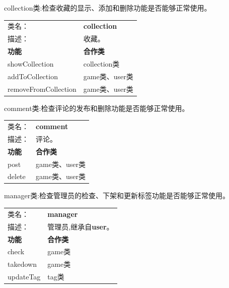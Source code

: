 \documentclass[12pt]{ctexart} %
\begin{document}
collection类:检查收藏的显示、添加和删除功能是否能够正常使用。
\begin{table}[H]
  \centering
  \begin{tabular}{|ll|}  %
    \cline{1-2}  %
    类名：& \textbf{collection} \\
    \cline{1-2}
    描述：& 收藏。 \\
    \cline{1-2}
    \multicolumn{1}{|l|}{\textbf{功能}} & {\textbf{合作类}} \\  %
    \hline
    \multicolumn{1}{|l|}{showCollection} & {collection类}  \\
    \hline
    \multicolumn{1}{|l|}{addToCollection} & {game类、user类} \\
    \hline
    \multicolumn{1}{|l|}{removeFromCollection} & {game类、user类} \\
    \hline
  \end{tabular}
\end{table}

comment类:检查评论的发布和删除功能是否能够正常使用。
\begin{table}[H]
  \centering
  \begin{tabular}{|ll|}  %
    \cline{1-2}  %
    类名：& \textbf{comment} \\
    \cline{1-2}
    描述：& 评论。 \\
    \cline{1-2}
    \multicolumn{1}{|l|}{\textbf{功能}} & {\textbf{合作类}} \\  %
    \hline
    \multicolumn{1}{|l|}{post} & {game类、user类} \\
    \hline
    \multicolumn{1}{|l|}{delete} & {game类、user类 }\\
    \hline
  \end{tabular}
\end{table}

manager类:检查管理员的检查、下架和更新标签功能是否能够正常使用。
\begin{table}[H]
  \centering
  \begin{tabular}{|ll|}  %
    \cline{1-2}  %
    类名：& \textbf{manager} \\
    \cline{1-2}
    描述：& 管理员,继承自\textbf{user}。 \\
    \cline{1-2}
    \multicolumn{1}{|l|}{\textbf{功能}} & \multicolumn{1}{|l|}{\textbf{合作类}} \\  
    \hline
    \multicolumn{1}{|l|}{check} & \multicolumn{1}{|l|}{game类} \\
    \hline
    \multicolumn{1}{|l|}{takedown} & \multicolumn{1}{|l|}{game类} \\
    \hline
    \multicolumn{1}{|l|}{updateTag} & \multicolumn{1}{|l|}{tag类} \\
    \hline
  \end{tabular}
\end{table}
\end{document}
